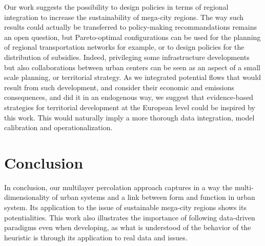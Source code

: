 \documentclass{jimis-en}
\begin{document}
Our work suggests the possibility to design policies in terms of regional integration to increase the sustainability of mega-city regions. The way such results could actually be transferred to policy-making recommandations remains an open question, but Pareto-optimal configurations can be used for the planning of regional transportation networks for example, or to design policies for the distribution of subsidies. Indeed, privileging some infrastructure developments but also collaborations between urban centers can be seen as an aspect of a small scale planning, or territorial strategy. As we integrated potential flows that would result from such development, and consider their economic and emissions consequences, and did it in an endogenous way, we suggest that evidence-based strategies for territorial development at the European level could be inspired by this work. This would naturally imply a more thorough data integration, model calibration and operationalization.

  

\section{Conclusion}


In conclusion, our multilayer percolation approach captures in a way the multi-dimensionality of urban systems and a link between form and function in urban system. Its application to the issue of sustainable mega-city regions shows its potentialities. This work also illustrates the importance of following data-driven paradigms even when developing, as what is understood of the behavior of the heuristic is through its application to real data and issues.















\end{document}
